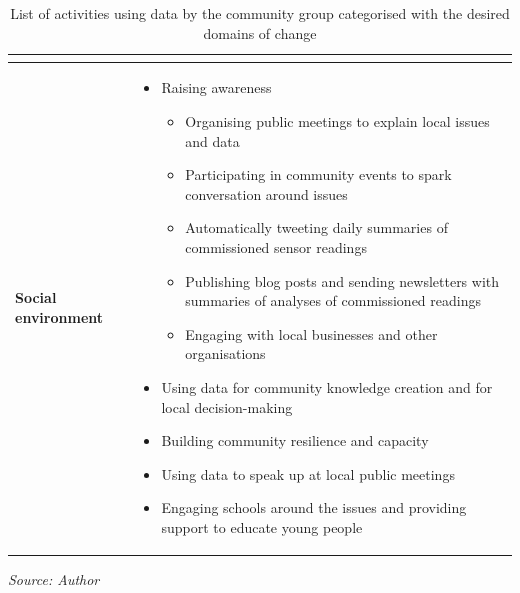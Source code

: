 \begin{table}[ht!]
\begin{tabular}{|>{\centering\arraybackslash}m{3cm}|m{120mm}|}
\begin{itemize}
\begin{itemize}
                \end{itemize}
        \end{itemize} \\
\hline
\textbf{Social environment} & 
        \begin{itemize}
            \item Raising awareness
                \begin{itemize}
                    \item Organising public meetings to explain local issues and data
                    \item Participating in community events to spark conversation around issues
                    \item Automatically tweeting daily summaries of commissioned sensor readings
                    \item Publishing blog posts and sending newsletters with summaries of analyses of commissioned readings
                    \item Engaging with local businesses and other organisations
                \end{itemize}
            \item Using data for community knowledge creation and for local decision-making
            \item Building community resilience and capacity
            \item Using data to speak up at local public meetings
            \item Engaging schools around the issues and providing support to educate young people
        \end{itemize}  \\ [0.5ex]
\hline
\end{tabular}

\smallskip\centering
    \footnotesize\emph{Source: Author}
\caption[Community Outcomes]{List of activities using data by the community group categorised with the desired domains of change}
\label{table:outcomes}
\end{table}

